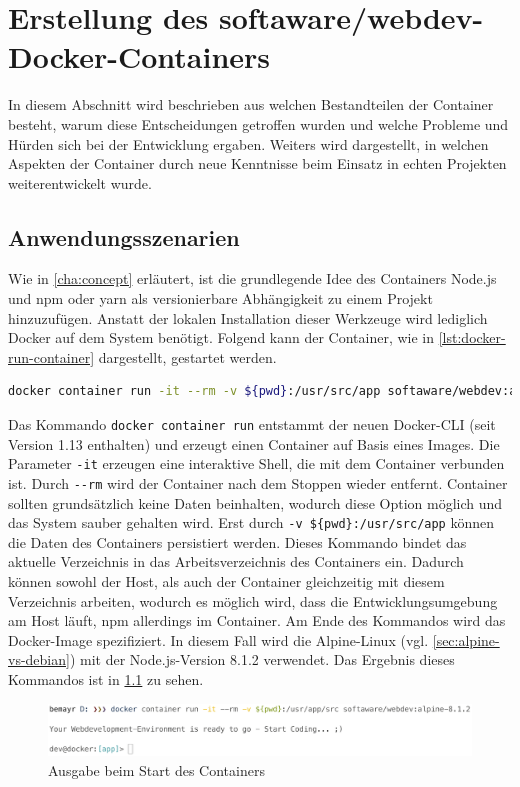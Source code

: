 \chapter{Erstellung des softaware/webdev-Docker-Containers}
\label{cha:implementation}
In diesem Abschnitt wird beschrieben aus welchen Bestandteilen der Container besteht, warum diese Entscheidungen getroffen wurden und welche Probleme und Hürden sich bei der Entwicklung ergaben.
Weiters wird dargestellt, in welchen Aspekten der Container durch neue Kenntnisse beim Einsatz in echten Projekten weiterentwickelt wurde.

\section{Anwendungsszenarien}
\label{sec:usage}
Wie in \cref{cha:concept} erläutert, ist die grundlegende Idee des Containers Node.js und npm oder yarn als versionierbare Abhängigkeit zu einem Projekt hinzuzufügen.
Anstatt der lokalen Installation dieser Werkzeuge wird lediglich Docker auf dem System benötigt.
Folgend kann der Container, wie in \cref{lst:docker-run-container} dargestellt, gestartet werden.
\begin{lstlisting}[caption=Kommando zum Starten des softaware/webdev-Containers, language=bash, label=lst:docker-run-container]
docker container run -it --rm -v ${pwd}:/usr/src/app softaware/webdev:alpine-8.1.2
\end{lstlisting}
Das Kommando \verb|docker container run| entstammt der neuen Docker-CLI (seit Version 1.13 enthalten) und erzeugt einen Container auf Basis eines Images.
Die Parameter \verb|-it| erzeugen eine interaktive Shell, die mit dem Container verbunden ist.
Durch \verb|--rm| wird der Container nach dem Stoppen wieder entfernt.
Container sollten grundsätzlich keine Daten beinhalten, wodurch diese Option möglich und das System sauber gehalten wird.
Erst durch \verb|-v ${pwd}:/usr/src/app| können die Daten des Containers persistiert werden.
Dieses Kommando bindet das aktuelle Verzeichnis in das Arbeitsverzeichnis des Containers ein.
Dadurch können sowohl der Host, als auch der Container gleichzeitig mit diesem Verzeichnis arbeiten, wodurch es möglich wird, dass die Entwicklungsumgebung am Host läuft, npm allerdings im Container.
Am Ende des Kommandos wird das Docker-Image spezifiziert.
In diesem Fall wird die Alpine-Linux (vgl. \cref{sec:alpine-vs-debian}) mit der Node.js-Version 8.1.2 verwendet.
Das Ergebnis dieses Kommandos ist in \cref{fig:container-execution} zu sehen.
\begin{figure}[htbp]
    \centering
    \includegraphics[width=0.95\linewidth,clip]{images/container-execution}
    \caption{Ausgabe beim Start des Containers}
\label{fig:container-execution}
\end{figure}

